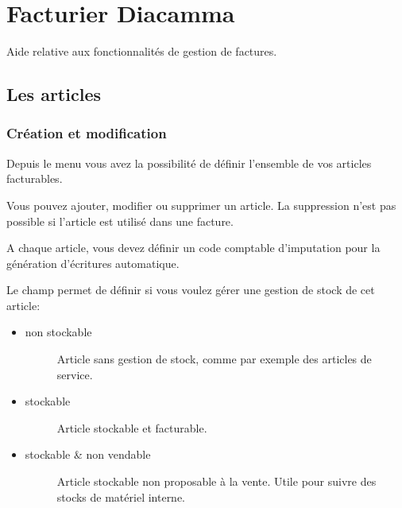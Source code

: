 \documentclass[a4paper,10pt,oneside,french]{sphinxmanual}
\begin{document}
\chapter{Facturier Diacamma}
\label{\detokenize{invoice/index:facturier-diacamma}}\label{\detokenize{invoice/index::doc}}
Aide relative aux fonctionnalités de gestion de factures.


\section{Les articles}
\label{\detokenize{invoice/articles:les-articles}}\label{\detokenize{invoice/articles::doc}}

\subsection{Création et modification}
\label{\detokenize{invoice/articles:creation-et-modification}}
Depuis le menu  vous avez la possibilité de définir l’ensemble de vos articles facturables.

\noindent{}

Vous pouvez ajouter, modifier ou supprimer un article. La suppression n’est pas possible si l’article est utilisé dans une facture.

A chaque article, vous devez définir un code comptable d’imputation pour la génération d’écritures automatique.

Le champ  permet de définir si vous voulez gérer une gestion de stock de cet article:
\begin{itemize}
\item {} \begin{description}
\item[{non stockable}] \leavevmode
Article sans gestion de stock, comme par exemple des articles de service.

\end{description}

\item {} \begin{description}
\item[{stockable}] \leavevmode
Article stockable et facturable.

\end{description}

\item {} \begin{description}
\item[{stockable \& non vendable}] \leavevmode
Article stockable non proposable à la vente.
Utile pour suivre des stocks de matériel interne.

\end{description}

\end{itemize}
\end{document}
